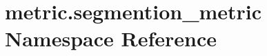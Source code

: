 \hypertarget{namespacemetric_1_1segmention__metric}{}\section{metric.\+segmention\+\_\+metric Namespace Reference}
\label{namespacemetric_1_1segmention__metric}
